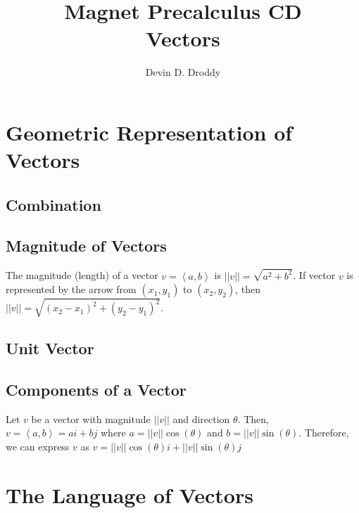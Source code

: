 \documentclass{report}
\title{\Huge{Magnet Precalculus CD}\\Vectors}
\author{\huge{Devin D. Droddy}}
\date{}
\begin{document}
\maketitle
\newpage%
\tableofcontents
\pagebreak

\chapter{Geometric Representation of Vectors}

\section{Combination }

\section{Magnitude of Vectors}

The magnitude (length) of a vector $v=\left\langle a,b \right\rangle$ is $||v||=\sqrt{a^2+b^2}$. If vector $v$ is represented by the arrow from $(x_1,y_1)$ to $(x_2,y_2)$, then $||v||=\sqrt{(x_2-x_1)^2+(y_2-y_1)^2}$.

\section{Unit Vector}


\section{Components of a Vector}

Let $v$ be a vector with magnitude $||v||$ and direction $\theta$. Then, $v=\left\langle a,b \right\rangle=ai+bj$ where $a=||v||\cos(\theta)$ and $b=||v||\sin(\theta)$. Therefore, we can express $v$ as $v=||v||\cos(\theta)i+||v||\sin(\theta)j$

\chapter{The Language of Vectors}
\end{document}
